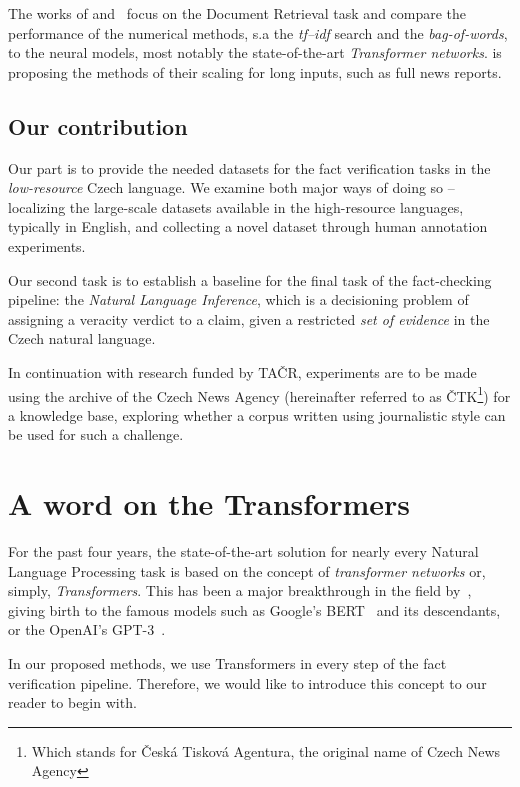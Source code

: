 The works of \cite{rypar} and~\cite{dedkova} focus on the Document Retrieval task and compare the performance of the numerical methods, s.a the \textit{tf--idf} search and the \textit{bag-of-words}, to the neural models, most notably the state-of-the-art \textit{Transformer networks}\cite{vaswani}. \cite{gazo} is proposing the methods of their scaling for long inputs, such as full news reports.

\subsection{Our contribution}
Our part is to provide the needed datasets for the fact verification tasks in the \textit{low-resource} Czech language. We examine both major ways of doing so -- localizing the large-scale datasets available in the high-resource languages, typically in English, and collecting a novel dataset through human annotation experiments.

Our second task is to establish a baseline for the final task of the fact-checking pipeline: the \textit{Natural Language Inference}, which is a decisioning problem of assigning a veracity verdict to a claim, given a restricted \textit{set of evidence} in the Czech natural language.

In continuation with research funded by \textsf{TAČR}, experiments are to be made using the archive of the \textsf{Czech News Agency} (hereinafter referred to as \textsf{ČTK}\footnote{Which stands for \"{\textsf{Česká Tisková Agentura}}, the original name of \textsf{Czech News Agency}}) for a knowledge base, exploring whether a corpus written using journalistic style can be used for such a challenge.



\section{A word on the Transformers}
\label{sec:transformers}
For the past four years, the state-of-the-art solution for nearly every Natural Language Processing task is based on the concept of \textit{transformer networks} or, simply, \textit{Transformers}. This has been a major breakthrough in the field by~\cite{vaswani}, giving birth to the famous models such as \textsf{Google}'s \textsf{BERT}~\cite{devlin2019bert} and its descendants, or the \textsf{OpenAI}'s \textsf{GPT-3}~\cite{gpt3}.

In our proposed methods, we use Transformers in every step of the fact verification pipeline. Therefore, we would like to introduce this concept to our reader to begin with. 

